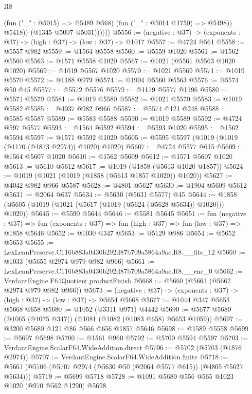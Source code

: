 \begin{lexlean}{R8}
\begin{coremodule}
                    (fun ("_" : @5015) => @5489 @568)
                    (fun ("_" : @5014 @1750) => @5498))
                  @5418))
              (@1345 @5007 @5031))))))
@5556 := (negative : @37) -> (exponents : @37) -> (high : @37) -> (low : @37) -> @1017
@5557 := @4724 @561
@5558 := @5557 @982
@5559 := @1564 @5558
@5560 := @5559 @1020
@5561 := @1562 @5560
@5563 := @1571 @5558 @1020
@5567 := @1021 (@5561 @5563 @1020 @1020)
@5569 := @1019 @5567 @1020
@5570 := @1021 @5569
@5571 := @1019 @5570
@5572 := @1188 @979
@5574 := @1904 @5560 @5563
@5576 := @5574 @50 @45
@5577 := @5572 @5576
@5579 := @1179 @5577 @1196
@5580 := @5571 @5579
@5581 := @1019 @5580
@5582 := @1021 @5570
@5583 := @1019 @5582
@5585 := @4037 @982 @966
@5587 := @5574 @121 @248
@5588 := @5585 @5587
@5589 := @5583 @5588
@5590 := @1019 @5589
@5592 := @4724 @597 @5577
@5593 := @1564 @5592
@5594 := @5593 @1020
@5595 := @1562 @5594
@5597 := @1571 @5592 @1020
@5605 := @5595 @5597 (@1019 (@1019 (@1170 (@1873 @2974)) @1020) @1020)
@5607 := @4724 @5577 @615
@5609 := @1564 @5607 @1020
@5610 := @1562 @5609
@5612 := @1571 @5607 @1020
@5613 := @5610 @5612
@5617 := @1019 (@1858 (@5613 @1020 @1857))
@5624 := @1019 (@1021 (@1019 (@1858 (@5613 @1857 @1020)) @1020))
@5627 := @4042 @982 @966 @5587
@5628 := @4801 @5627
@5630 := @1904 @5609 @5612
@5631 := @2064 @637
@5634 := @5630 (@5631 @5577) @45
@5644 := @1858 (@5605 (@1019 (@1021 (@5617 (@1019 (@5624 (@5628 @5634)) @1020))) @1020))
@5645 := @5590 @5644
@5646 := @5581 @5645
@5651 := fun (negative : @37) =>
  fun (exponents : @37) => fun (high : @37) => fun (low : @37) => @1858 @5646
@5652 := @1030 @347
@5653 := @5129 @986
@5654 := @5652 @5653
@5655 := LexLeanPreserve.C116b883a0430b292d87b709a5864a9ac.R8.__fits_12
@5660 := @1033 (@5655 @2974 @979 @982 @966)
@5661 := LexLeanPreserve.C116b883a0430b292d87b709a5864a9ac.R8.__enc_0
@5662 := VerdantEngine.F64Quotient.productFinish
@5668 := @5660 (@5661 (@5662 @2974 @979 @982 @966))
@5673 := (negative : @37) -> (exponents : @37) -> (high : @37) -> (low : @37) -> @5654 @5668
@5677 := @1044 @347 @5653 @5668 @658
@5680 := @1052 (@3311 @971) @4442
@5690 := @5677 @5680 (@1065 (@1075 @347)) (@1081 (@1082 (@1083 @658) @5653 @1059))
@5697 := @3200 @5680 @121 @86 @566 @656 @1857 @5646
@5698 := @1589 @5558
@5699 := @5697 @5698
@5700 := @1561 @960
@5702 := @5700 @5594 @5597
@5703 := VerdantEngine.ScalarF64.WideAddition.direct
@5706 := @5702 (@5703 (@1876 @2974))
@5707 := VerdantEngine.ScalarF64.WideAddition.finite
@5718 := @5661 (@5706 (@5707 @2974 (@5630 @50 (@2064 @5577 @615)) (@4805 @5627 @5634)))
@5719 := @5699 @5718
@5728 := @1091 @5680 @556 @565 @1023 @1020 (@970 @562 @1290) @5698

\end{coremodule}
\end{lexlean}
